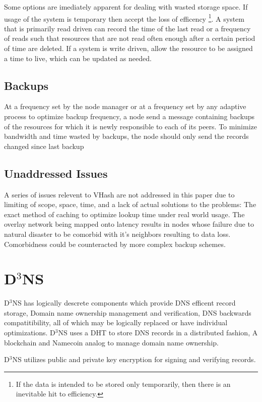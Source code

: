 \documentclass[11pt]{IEEEtran} %
\begin{document}
Some options are imediately apparent for dealing with wasted storage space. If usage of the system is temporary then accept the loss of efficency \footnote{If the data is intended to be stored only temporarily, then there is an inevitable hit to efficiency.}.  A system that is primarily read driven can record the time of the last read or a frequency of reads such that resources that are not read often enough after a certain period of time are deleted. If a system is write driven, allow the resource to be assigned a time to live, which can be updated as needed.

\subsection{Backups}
At a frequency set by the node manager or at a frequency set by any adaptive process to optimize backup frequency, a node send a message containing backups of the resources for which it is newly responsible to each of its peers. To minimize bandwidth and time wasted by backups, the node should only send the records changed since last backup

\subsection{Unaddressed Issues}
A series of issues relevent to VHash are not addressed in this paper due to limiting of scope, space, time, and a lack of actual solutions to the problems: The exact method of caching to optimize lookup time under real world usage. The overlay network being mapped onto latency results in nodes whose failure due to natural disaster to be comorbid with it's neighbors resulting to data loss. Comorbidness could be counteracted by more complex backup schemes.

\section{D$^{3}$NS}
D$^{3}$NS has logically descrete components which provide DNS efficent record storage, Domain name ownership management and verification, DNS backwards compatitibility, all of which may be logically replaced or have individual optimizations. D$^{3}$NS uses a DHT to store DNS records in a distributed fashion, A blockchain and Namecoin\cite{namecoin} analog to manage domain name ownership.

D$^{3}$NS utilizes public and private key encryption for signing and verifying records.
\end{document}
